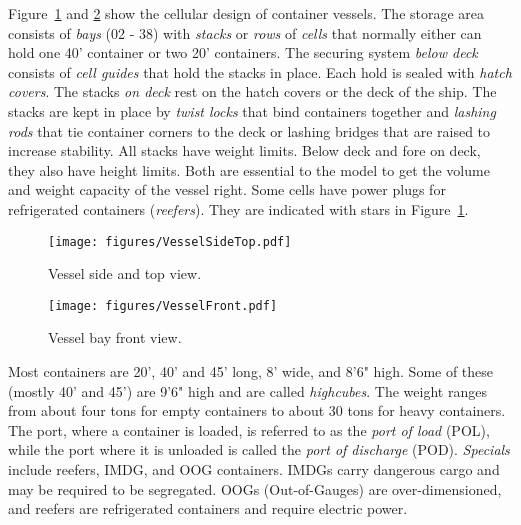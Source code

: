 \documentclass[preprint,12pt,authoryear]{elsarticle}
\begin{document}
Figure~\ref{fig:vesselside} and \ref{fig:vesselfront} show the cellular design of container vessels. The storage area consists of {\em bays} (02 - 38) with {\em stacks} or {\em rows} of {\em cells} that normally either can hold one 40' container or two 20' containers. The securing system {\em below deck} consists of {\em cell guides} that hold the stacks in place. Each hold is sealed with {\em hatch covers}. The stacks {\em on deck} rest on the hatch covers or the deck of the ship. The stacks are kept in place by {\em twist locks} that bind containers together and {\em lashing rods} that tie container corners to the deck or lashing bridges that are raised to increase stability. All stacks have weight limits. Below deck and fore on deck, they also have height limits. Both are essential to the model to get the volume and weight capacity of the vessel right. Some cells have power plugs for refrigerated containers ({\em reefers}). They are indicated with stars in Figure~\ref{fig:vesselside}. 

\begin{figure}[h!]
	\centering
		\texttt{[image: figures/VesselSideTop.pdf]} 
	\caption{Vessel side and top view.}
	\label{fig:vesselside}
\end{figure}

\begin{figure}[h!]
	\centering
		\texttt{[image: figures/VesselFront.pdf]} 
	\caption{Vessel bay front view.}
	\label{fig:vesselfront}
\end{figure}

Most containers are 20', 40' and 45' long, 8' wide, and 8'6" high. Some of these (mostly 40' and 45') are 9'6" high and are called {\em highcubes}. The weight ranges from about four tons for empty containers to about 30 tons for heavy containers. %
The port, where a container is loaded, is referred to as the  {\em port of load} (POL), while the port where it is unloaded is called the {\em port of discharge} (POD). {\em Specials} include reefers, IMDG, and OOG containers. IMDGs carry dangerous cargo and may be required to be segregated. OOGs (Out-of-Gauges) are over-dimensioned, and reefers are refrigerated containers and require electric power. 
\end{document}
